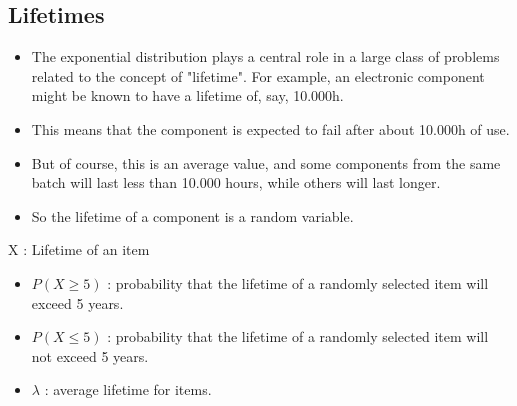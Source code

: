 \documentclass[a4paper,12pt]{article}
\begin{document}
\subsection*{Lifetimes}
\begin{itemize}
	\item The exponential distribution plays a central role in a large class of problems related to the concept of "lifetime". 
	For example, an electronic component might be known to have a lifetime of, say, 10.000h. 
	\item This means that the component is expected to fail after about 10.000h of use. 
	\item But of course, this is an average value, and some components from the same batch will last less than 10.000 hours, while others will last longer. 
	\item So the lifetime of a component is a random variable.
\end{itemize}


%
%

\begin{framed}

\noindent X : Lifetime of an item

\begin{itemize}
\item $P(X \geq 5)$ : probability that the lifetime of a randomly selected item will exceed 5 years.

\item$P(X \leq 5)$ : probability that the lifetime of a randomly selected item will not exceed 5 years.

\item $\lambda$ : average lifetime for items.
\end{itemize}
\end{framed}




%
%
%	
%
%
\end{document}
